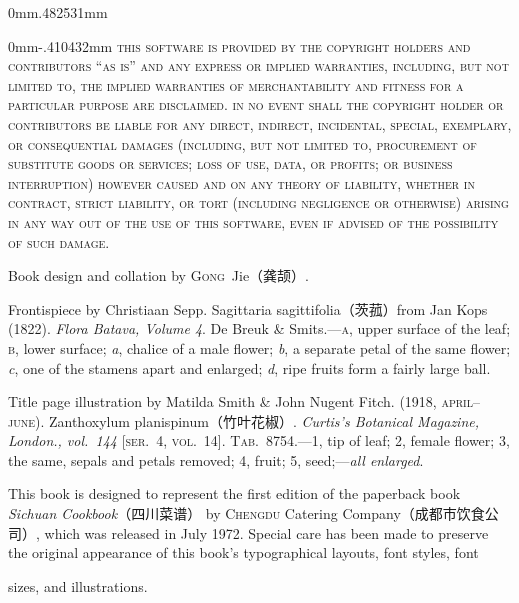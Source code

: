 \begin{adjustwidth}{0mm}{.482531mm}
%
\begin{adjustwidth}{0mm}{-.410432mm}
\begingroup%
%
\textsc{this software is provided by the copyright holders and contributors
``as is'' and any express or implied warranties, including, but not limited to,
the implied warranties of merchantability and fitness for a particular purpose
are disclaimed. in no event shall the copyright holder or contributors be
liable for any direct, indirect, incidental, special, exemplary, or
consequential damages (including, but not limited to, procurement of
substitute goods or services; loss of use, data, or profits; or business
interruption) however caused and on any theory of liability, whether in
contract, strict liability, or tort (including negligence or otherwise)
arising in any way out of the use of this software, even if advised of the
possibility of such damage.}
\endgroup%
\end{adjustwidth}
\null
\vspace{-.5\baselineskip}

\vfill

Book design and collation by \textsc{Gong}~Jie\!（龚颉）\!\!\!.

Frontispiece by Christiaan Sepp. Sagittaria sagittifolia\!（茨菰）\!from Jan
Kops (1822). \textit{Flora Batava, Volume 4}. De Breuk \& Smits.---\textsc{a},
upper surface of the leaf; \textsc{b}, lower surface; \textit{a}, chalice of a
male flower; \textit{b}, a separate petal of the same flower; \textit{c}, one
of the stamens apart and enlarged; \textit{d}, ripe fruits form a fairly large
ball.

Title page illustration by Matilda Smith \& John Nugent Fitch. (1918,
\textsc{april--june}). Zanthoxylum planispinum\!（竹叶花椒）\!\!\!.
\textit{Curtis's Botanical Magazine, London., vol.~144} [\textsc{ser}.~4,
\textsc{vol}.~14]. \textsc{Tab}.~8754.---1, tip of leaf; 2, female flower;
3, the same, sepals and petals removed; 4, fruit; 5, seed;---\textit{all
enlarged}.

This book is designed to represent the first edition of the paperback book
\textit{Sichuan Cookbook}{\kafamily（四川菜谱）}\!\! by \textsc{Chengdu}
Catering Company\!（成都市饮食公司）\!\!\!, which was released in July 1972.
Special care has been made to preserve the original appearance of this book's
typographical layouts, font styles, font
\ifdefined\savedparskip\else\newlength{\savedparskip}\fi%
\setlength{\savedparskip}{\parskip}%
\begin{minipage}[t][4\baselineskip+2\savedparskip]{.739726\textwidth}%
\setlength{\parskip}{\savedparskip}
sizes, and illustrations.


\end{minipage}
\end{adjustwidth}
